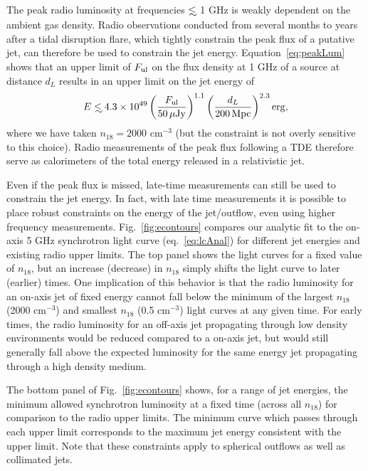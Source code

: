 \documentclass[usenatbib,fleqn]{mnras}
\newcommand\lsim{\mathrel{\rlap{\lower4pt\hbox{\hskip1pt$\sim$}}
    \raise1pt\hbox{$<$}}}
\begin{document}
The peak radio luminosity at frequencies $\lsim$ 1 GHz is weakly
dependent on the ambient gas density. Radio observations conducted
from several months to years after a tidal disruption flare, which
tightly constrain the peak flux of a putative jet, can therefore be
used to constrain the jet energy.  Equation~\eqref{eq:peakLum} shows
that an upper limit of $F_{\rm ul}$ on the flux density at 1 GHz of a
source at distance $d_L$ results in an upper limit on the jet energy
of
\begin{equation}
  E\lsim 4.3 \times 10^{49} \left(\frac{F_{\rm ul}}{50 \,\mu{\rm Jy}}\right)^{1.1}
  \left(\frac{d_L}{200 \,{\rm Mpc}}\right)^{2.3} {\rm erg},
\end{equation}
%
where we have taken $n_{18}=2000$ cm$^{-3}$ (but the constraint is not
overly sensitive to this choice). Radio measurements of the peak flux
following a TDE therefore serve as calorimeters of the total energy
released in a relativistic jet.

Even if the peak flux is missed, late-time measurements can still be
used to constrain the jet energy. In fact, with late time measurements
it is possible to place robust constraints on the energy of the
jet/outflow, even using higher frequency
measurements. Fig.~\ref{fig:econtours} compares our analytic fit to
the on-axis 5 GHz synchrotron light curve (eq.~\ref{eq:lcAnal}) for
different jet energies and existing radio upper limits.  The top panel
shows the light curves for a fixed value of $n_{18}$, but an increase
(decrease) in $n_{18}$ simply shifts the light curve to later
(earlier) times.  One implication of this behavior is that the radio
luminosity for an on-axis jet of fixed energy cannot fall below the
minimum of the largest $n_{18}$ (2000 cm$^{-3}$) and smallest $n_{18}$
(0.5 cm$^{-3}$) light curves at any given time. For early times, the
radio luminosity for an off-axis jet propagating through low density
environments would be reduced compared to a on-axis jet, but would
still generally fall above the expected luminosity for the same energy
jet propagating through a high density medium.


The bottom panel of Fig.~\ref{fig:econtours} shows, for a range of jet
energies, the minimum allowed synchrotron luminosity at a fixed time
(across all $n_{18}$) for comparison to the radio upper limits.  The
minimum curve which passes through each upper limit corresponds to the
maximum jet energy consistent with the upper limit.  Note that these
constraints apply to spherical outflows as well as collimated jets.
\end{document}
